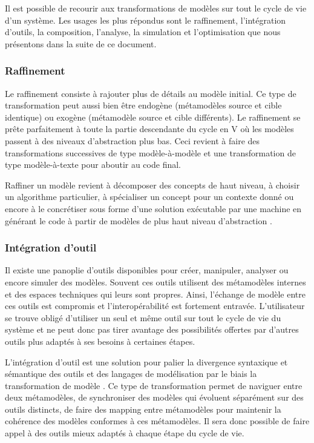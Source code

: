 Il est possible de recourir aux transformations de modèles sur tout le cycle de vie d'un système. Les usages les plus répondus sont le raffinement, l'intégration d'outils, la composition, l'analyse, la simulation et l'optimisation que nous présentons dans la suite de ce document. 

\subsubsection{Raffinement}
Le raffinement consiste à rajouter plus de détails au modèle initial. Ce type de transformation peut aussi bien être endogène (métamodèles source et cible identique) ou exogène (métamodèle source et cible différents). Le raffinement se prête parfaitement à toute la partie descendante du cycle en V où les modèles passent à des niveaux d'abstraction plus bas. Ceci revient à faire des transformations successives de type modèle-à-modèle et une transformation de type modèle-à-texte pour aboutir au code final.

Raffiner un modèle revient à décomposer des concepts de haut niveau, à choisir un algorithme particulier, à spécialiser un concept pour un contexte donné ou encore à le concrétiser sous forme d'une solution exécutable par une machine en générant le code à partir de modèles de plus haut niveau d'abstraction \cite{czarnecki2000intentional}. 

\subsubsection{Intégration d'outil}
Il existe une panoplie d'outils disponibles pour créer, manipuler, analyser ou encore simuler des modèles. Souvent ces outils utilisent des métamodèles internes et des espaces techniques qui leurs sont propres. Ainsi, l'échange de modèle entre ces outils est compromis et l'interopérabilité est fortement entravée. L'utilisateur se trouve obligé d'utiliser un seul et même outil sur tout le cycle de vie du système et ne peut donc pas tirer avantage des possibilités offertes par d'autres outils plus adaptés à ses besoins à certaines étapes.

L'intégration d'outil est une solution pour palier la divergence syntaxique et sémantique des outils et des langages de modélisation par le biais la transformation de modèle \cite{tratt2005model}. Ce type de transformation permet de naviguer entre deux métamodèles, de synchroniser des modèles qui évoluent séparément sur des outils distincts, de faire des mapping entre métamodèles pour maintenir la cohérence des modèles conformes à ces métamodèles. Il sera donc possible de faire appel à des outils mieux adaptés à chaque étape du cycle de vie.

